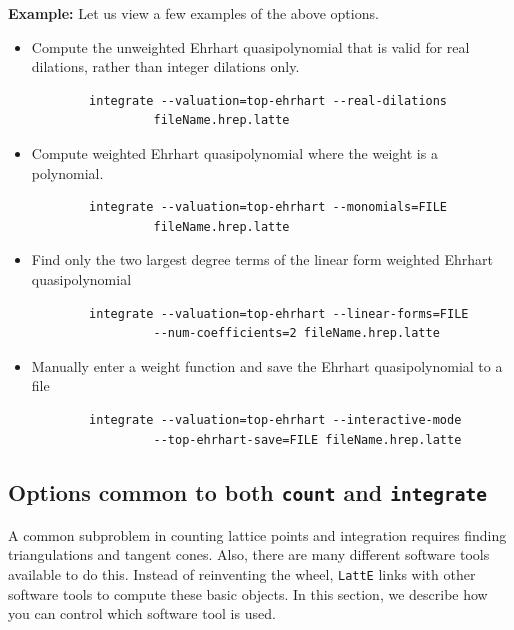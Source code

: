 \documentclass{article}
\newcommand{\latte}{{\tt LattE}\xspace}
\newcommand{\example}{{\bf Example:\space}}
\begin{document}
\example
Let us view a few examples of the above options.

\begin{itemize}
\item Compute the unweighted Ehrhart quasipolynomial that is valid for real
  dilations, rather than integer dilations only. 
\begin{verbatim}
        integrate --valuation=top-ehrhart --real-dilations  
                 fileName.hrep.latte
        \end{verbatim}  
\item Compute weighted Ehrhart quasipolynomial where the weight is a polynomial.
        \begin{verbatim}
        integrate --valuation=top-ehrhart --monomials=FILE 
                 fileName.hrep.latte
        \end{verbatim}  
\item Find only the two largest degree terms of the linear form weighted Ehrhart quasipolynomial
        \begin{verbatim}
        integrate --valuation=top-ehrhart --linear-forms=FILE 
                 --num-coefficients=2 fileName.hrep.latte                               
        \end{verbatim}  
\item Manually enter a weight function and save the Ehrhart quasipolynomial to a file
        \begin{verbatim}
        integrate --valuation=top-ehrhart --interactive-mode 
                 --top-ehrhart-save=FILE fileName.hrep.latte
        \end{verbatim}  
\end{itemize}

\subsection{Options common to both {\tt count} and {\tt integrate}}

A common subproblem in counting lattice points and integration requires finding triangulations and tangent cones. Also, there are many different software tools available to do this. Instead of reinventing the wheel, \latte links with other software tools to compute these basic objects. In this section, we describe how you can control which software tool is used.
\end{document}
